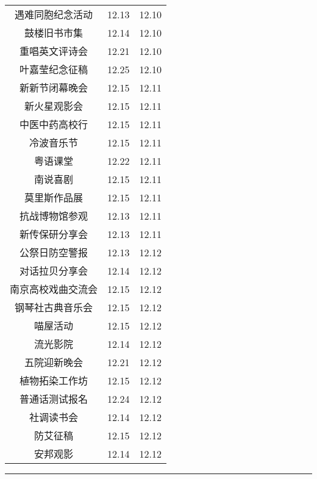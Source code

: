 \documentclass[letterpaper, 12pt]{article}
\begin{document}
\begin{multicols}{2}
{\begin{longtable}{|c|c|c|}
    遇难同胞纪念活动 & 12.13 & 12.10\\
    鼓楼旧书市集 & 12.14 & 12.10\\
    重唱英文评诗会 & 12.21 & 12.10\\
    叶嘉莹纪念征稿 & 12.25 & 12.10\\
    新新节闭幕晚会 & 12.15 & 12.11\\
    新火星观影会 & 12.15 & 12.11\\
    中医中药高校行 & 12.15 & 12.11\\
    冷波音乐节 & 12.15 & 12.11\\
    粤语课堂 & 12.22 & 12.11\\
    南说喜剧 & 12.15 & 12.11\\
    莫里斯作品展 & 12.15 & 12.11\\
    抗战博物馆参观 & 12.13 & 12.11\\
    新传保研分享会 & 12.13 & 12.11\\
    公祭日防空警报 & 12.13 & 12.12\\
    对话拉贝分享会 & 12.14 & 12.12\\
    南京高校戏曲交流会 & 12.15 & 12.12\\
    钢琴社古典音乐会 & 12.15 & 12.12\\
    喵屋活动 & 12.15 & 12.12\\
    流光影院 & 12.14 & 12.12\\
    五院迎新晚会 & 12.21 & 12.12\\
    植物拓染工作坊 & 12.15 & 12.12\\
    普通话测试报名 & 12.24 & 12.12\\
    社调读书会 & 12.14 & 12.12\\
    防艾征稿 & 12.15 & 12.12\\
    安邦观影 & 12.14 & 12.12\\
    \hline
\end{longtable}
\unskip
\unpenalty
\unpenalty}\unvbox\colbbox
\end{multicols}
\hrule
\pagebreak
\end{document}
